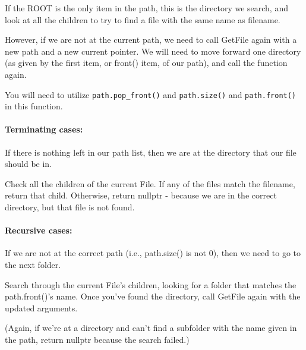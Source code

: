 \documentclass[a4paper,12pt,oneside]{book}
\begin{document}
If the ROOT is the only item in the path, this is the directory we search,
and look at all the children to try to find a file with the same name as filename.

However, if we are not at the current path, we need to call GetFile again with a new path and a new current pointer. We will need to move forward one directory (as given by the first item, or front() item, of our path), and call the function again.

You will need to utilize \texttt{path.pop\_front()} and
\texttt{path.size()} and \texttt{path.front()} in this function.


\paragraph{Terminating cases:}

If there is nothing left in our path list, then we are at the directory that our file should be in.

Check all the children of the current File. If any of the files match the filename, return that child. Otherwise, return nullptr - because we are in the correct directory, but that file is not found.

\paragraph{Recursive cases:}

If we are not at the correct path (i.e., path.size() is not 0), then we need to go to the next folder.

Search through the current File's children, looking for a folder that matches the path.front()'s name. Once you've found the directory, call GetFile again with the updated arguments.

(Again, if we're at a directory and can't find a subfolder with the name given in the path, return nullptr because the search failed.)
\end{document}
